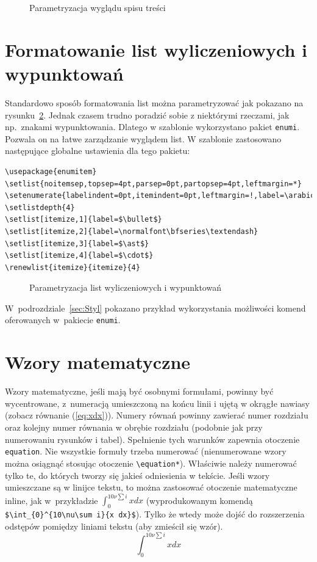 \begin{figure}[b]
\drawtoc
\caption{Parametryzacja wyglądu spisu treści} \label{fig:ltoc}
\end{figure}


\section{Formatowanie list wyliczeniowych i wypunktowań}
Standardowo sposób formatowania list można parametryzować jak pokazano na rysunku~\ref{fig:listlay}. Jednak czasem trudno poradzić sobie z niektórymi rzeczami, jak np.~znakami wypunktowania. Dlatego w szablonie wykorzystano pakiet \texttt{enumi}. Pozwala on na łatwe zarządzanie wyglądem list. W szablonie zastosowano następujące globalne ustawienia dla tego pakietu:
\begin{lstlisting}[basicstyle=\footnotesize\ttfamily]
\usepackage{enumitem} 
\setlist{noitemsep,topsep=4pt,parsep=0pt,partopsep=4pt,leftmargin=*} 
\setenumerate{labelindent=0pt,itemindent=0pt,leftmargin=!,label=\arabic*.} 
\setlistdepth{4} 
\setlist[itemize,1]{label=$\bullet$} 
\setlist[itemize,2]{label=\normalfont\bfseries\textendash}
\setlist[itemize,3]{label=$\ast$}
\setlist[itemize,4]{label=$\cdot$}
\renewlist{itemize}{itemize}{4}
\end{lstlisting}
\begin{figure}[b]
\centering
{}
\drawparameterstrue
\drawlist
\caption{Parametryzacja list wyliczeniowych i wypunktowań}\label{fig:listlay}
\end{figure}

W~podrozdziale~\ref{sec:Styl} pokazano przykład wykorzystania możliwości komend oferowanych w~pakiecie \texttt{enumi}.

\section{Wzory matematyczne}
Wzory matematyczne, jeśli mają być osobnymi formułami, powinny być wycentrowane, z~numeracją umieszczoną na końcu linii i ujętą w okrągłe nawiasy (zobacz równanie (\ref{eq:xdx})). Numery równań powinny zawierać numer rozdziału oraz kolejny numer równania w obrębie rozdziału (podobnie jak przy numerowaniu rysunków i tabel). Spełnienie tych warunków zapewnia otoczenie \verb?equation?. Nie wszystkie formuły trzeba numerować (nienumerowane wzory można osiągnąć stosując otoczenie \verb?\equation*?). Właściwie należy numerować tylko te, do których tworzy się jakieś odniesienia w tekście. Jeśli wzory umieszczane są w linijce tekstu, to można zastosować otoczenie matematyczne inline, jak w~przykładzie $\int_{0}^{10\nu\sum i}{x dx}$ (wyprodukowanym komendą \verb?$\int_{0}^{10\nu\sum i}{x dx}$?). Tylko że wtedy może dojść do rozszerzenia odstępów pomiędzy liniami tekstu (aby zmieścił się wzór).
\begin{equation}\label{eq:xdx}
\int_{0}^{10\nu\sum i}{x dx}
\end{equation}